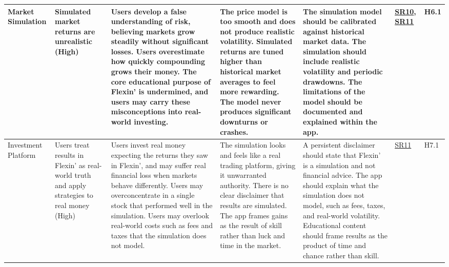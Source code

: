 \documentclass{article}
\begin{document}
\begin{landscape}
{\begin{longtable}{|p{2.5cm}|p{3cm}|p{3.8cm}|p{3.8cm}|p{5.5cm}|p{1.8cm}|p{1cm}|}
            \hline
            Market Simulation & Simulated market returns are unrealistic (High) & \textbullet{} Users develop a false understanding of risk, believing markets grow steadily without significant losses. \newline \textbullet{} Users overestimate how quickly compounding grows their money. \newline \textbullet{} The core educational purpose of Flexin' is undermined, and users may carry these misconceptions into real-world investing. & \textbullet{} The price model is too smooth and does not produce realistic volatility. \newline \textbullet{} Simulated returns are tuned higher than historical market averages to feel more rewarding. \newline \textbullet{} The model never produces significant downturns or crashes. & \textbullet{} The simulation model should be calibrated against historical market data. \newline \textbullet{} The simulation should include realistic volatility and periodic drawdowns. \newline \textbullet{} The limitations of the model should be documented and explained within the app. & \hyperlink{sr10}{SR10}, \hyperlink{sr11}{SR11} & H6.1 \\
            \hline
            Investment Platform & Users treat results in Flexin' as real-world truth and apply strategies to real money (High) & \textbullet{} Users invest real money expecting the returns they saw in Flexin', and may suffer real financial loss when markets behave differently. \newline \textbullet{} Users may overconcentrate in a single stock that performed well in the simulation. \newline \textbullet{} Users may overlook real-world costs such as fees and taxes that the simulation does not model. & \textbullet{} The simulation looks and feels like a real trading platform, giving it unwarranted authority. \newline \textbullet{} There is no clear disclaimer that results are simulated. \newline \textbullet{} The app frames gains as the result of skill rather than luck and time in the market. & \textbullet{} A persistent disclaimer should state that Flexin' is a simulation and not financial advice. \newline \textbullet{} The app should explain what the simulation does not model, such as fees, taxes, and real-world volatility. \newline \textbullet{} Educational content should frame results as the product of time and chance rather than skill. & \hyperlink{sr11}{SR11} & H7.1 \\

\end{longtable}}
\end{landscape}
\end{document}
